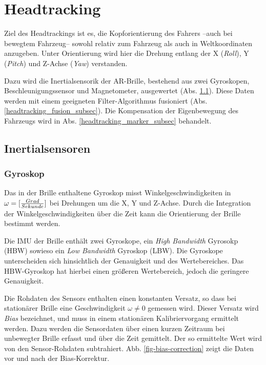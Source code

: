
\section{Headtracking}

Ziel des Headtrackings ist es, die Kopforientierung des Fahrers --auch bei bewegtem Fahrzeug-- sowohl relativ zum Fahrzeug als auch in Weltkoordinaten anzugeben. Unter Orientierung wird hier die Drehung entlang der X (\emph{Roll}), Y (\emph{Pitch}) und Z-Achse (\emph{Yaw}) verstanden.

Dazu wird die Inertialsensorik der \ac{AR}-Brille, bestehend aus zwei Gyroskopen, Beschleunigungssensor und Magnetometer, ausgewertet (Abs. \ref{headtracking_imu_subsec}).
Diese Daten werden mit einem geeigneten Filter-Algorithmus fusioniert (Abs. \ref{headtracking_fusion_subsec}).
Die Kompensation der Eigenbewegung des Fahrzeugs wird in Abs. \ref{headtracking_marker_subsec} behandelt.


\subsection{Inertialsensoren}
\label{headtracking_imu_subsec}


\subsubsection{Gyroskop}

Das in der Brille enthaltene Gyroskop misst Winkelgeschwindigkeiten in
$\omega = [{Grad \over Sekunde}]$ bei Drehungen um die X, Y und Z-Achse. Durch
die Integration der Winkelgeschwindigkeiten über die Zeit kann die
Orientierung der Brille bestimmt werden.  

Die IMU der Brille enthält zwei
Gyroskope, ein \emph{High Bandwidth} Gyrosokp (HBW) sowieso ein
\emph{Low Bandwidth} Gyroskop (LBW). Die Gyroskope unterscheiden sich
hinsichtlich der Genauigkeit und des Wertebereiches. Das HBW-Gyroskop
hat hierbei einen größeren Wertebereich, jedoch die geringere
Genauigkeit.

Die Rohdaten des Sensors enthalten einen konstanten Versatz, so dass bei
stationärer Brille eine Geschwindigkeit $\omega \neq 0$ gemessen wird.
Dieser Versatz wird \emph{Bias} bezeichnet, und muss in einem
stationären Kalibriervorgang ermittelt werden. Dazu werden die
Sensordaten über einen kurzen Zeitraum bei unbewegter Brille erfasst und
über die Zeit gemittelt. Der so ermittelte Wert wird von den
Sensor-Rohdaten subtrahiert. Abb. \ref{fig-bias-correction} zeigt die Daten vor
und nach der Bias-Korrektur.


